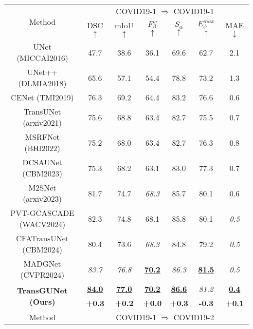 \begin{table}[h]
    \centering
    \scriptsize
    \setlength\tabcolsep{2pt} %
    \renewcommand{\arraystretch}{0.9} %
    \begin{tabular}{c|cccccc}
    \hline
    \multicolumn{1}{c|}{\multirow{2}{*}{Method}} & \multicolumn{6}{c}{COVID19-1 $\Rightarrow$ COVID19-1} \\ \cline{2-7}
     & DSC \scriptsize{$\uparrow$} & mIoU \scriptsize{$\uparrow$} & $F_{\beta}^{w}$ \scriptsize{$\uparrow$}  & $S_{\alpha}$ \scriptsize{$\uparrow$} & $E_{\phi}^{max}$ \scriptsize{$\uparrow$} & MAE \scriptsize{$\downarrow$} \\
     \hline
     UNet \tiny{(MICCAI2016)}       & 47.7 & 38.6 & 36.1 & 69.6 & 62.7 & 2.1 \\
     UNet++ \tiny{(DLMIA2018)}      & 65.6 & 57.1 & 54.4 & 78.8 & 73.2 & 1.3 \\
     CENet \tiny{(TMI2019)}         & 76.3 & 69.2 & 64.4 & 83.2 & 76.6 & 0.6 \\
     TransUNet \tiny{(arxiv2021)}   & 75.6 & 68.8 & 63.4 & 82.7 & 75.5 & 0.7 \\
     MSRFNet \tiny{(BHI2022)}       & 75.2 & 68.0 & 63.4 & 82.7 & 76.3 & 0.8 \\
     DCSAUNet \tiny{(CBM2023)}      & 75.3 & 68.2 & 63.1 & 83.0 & 77.3 & 0.7 \\
     M2SNet \tiny{(arxiv2023)}      & 81.7 & 74.7 & \textit{68.3} & 85.7 & 80.1 & 0.6 \\
     PVT-GCASCADE \tiny{(WACV2024)} & 82.3 & 74.8 & 68.1 & 85.8 & 80.1 & \textit{0.5} \\
     CFATransUNet \tiny{(CBM2024)}  & 80.4 & 73.6 & \textit{68.3} & 84.8 & 79.2 & \textit{0.5} \\
     MADGNet \tiny{(CVPR2024)}      & \textit{83.7} & \textit{76.8} & \textbf{\underline{70.2}} & \textit{86.3} & \textbf{\underline{81.5}} & \textit{0.5} \\
     \hline
     \multicolumn{1}{c|}{\multirow{2}{*}{\textbf{TransGUNet \tiny{(Ours)}}}}     & \textbf{\underline{84.0}} & \textbf{\underline{77.0}} & \textbf{\underline{70.2}} & \textbf{\underline{86.6}} & \textit{81.2} & \textbf{\underline{0.4}} \\ \cline{2-7}
     & \textbf{+0.3} & \textbf{+0.2} & \textbf{+0.0} & \textbf{+0.3} & \textbf{-0.3} & \textbf{+0.1} \\
    \hline
    \multicolumn{1}{c|}{\multirow{2}{*}{Method}} & \multicolumn{6}{c}{COVID19-1 $\Rightarrow$ COVID19-2} \\ \cline{2-7}

\end{tabular}
\end{table}
